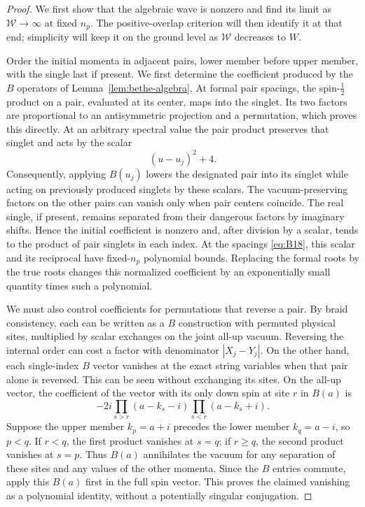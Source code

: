 \begin{proof}
We first show that the algebraic wave is nonzero and find its limit as
$\mathcal W\to\infty$ at fixed $n_p$.  The positive-overlap criterion
will then identify it at that end; simplicity will keep it on the ground
level as $\mathcal W$ decreases to $W$.

Order the initial momenta in adjacent pairs, lower member before upper
member, with the single last if present.  We first determine the
coefficient produced by the $B$ operators of Lemma~\ref{lem:bethe-algebra}.
At formal pair spacings, the spin-$\frac12$ product on a pair, evaluated
at its center, maps into the singlet.  Its two factors are proportional
to an antisymmetric projection and a permutation, which proves this
directly.  At an arbitrary spectral value the pair product preserves
that singlet and acts by the scalar
\[
 (u-u_j)^2+4.
\]
Consequently, applying $B(u_j)$ lowers the designated pair into its
singlet while acting on previously produced singlets by these scalars.
The vacuum-preserving factors on the other pairs can vanish only when
pair centers coincide.  The real single, if present, remains separated
from their dangerous factors by imaginary shifts.  Hence the initial
coefficient is nonzero and, after division by a scalar, tends to the
product of pair singlets in each index.  At the spacings
\eqref{eq:B18}, this scalar and its reciprocal have fixed-$n_p$
polynomial bounds.  Replacing the formal roots by the true roots changes
this normalized coefficient by an exponentially small quantity times
such a polynomial.

We must also control coefficients for permutations that reverse a pair.
By braid consistency, each can be written as a $B$ construction with
permuted physical sites, multiplied by scalar exchanges on the joint
all-up vacuum.  Reversing the internal order can cost a factor with
denominator $|X_j-Y_j|$.  On the other hand, each single-index $B$
vector vanishes at the exact string variables when that pair alone is
reversed.  This can be seen without exchanging its sites.  On the
all-up vector, the coefficient of the vector with its only down spin
at site $r$ in $B(a)$ is
\[
 -2i\prod_{s>r}(a-k_s-i)\prod_{s<r}(a-k_s+i).
\]
Suppose the upper member $k_p=a+i$ precedes the lower member
$k_q=a-i$, so $p<q$.  If $r<q$, the first product vanishes at $s=q$;
if $r\geq q$, the second product vanishes at $s=p$.  Thus $B(a)$
annihilates the vacuum for any separation of these sites and any values
of the other momenta.  Since the $B$ entries commute, apply this $B(a)$
first in the full spin vector.  This proves the claimed vanishing as
a polynomial identity, without a potentially singular conjugation.


\end{proof}

